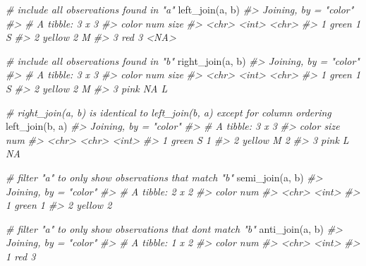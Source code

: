 \documentclass[
]{book}
\newenvironment{Shaded}{\begin{snugshade}}{\end{snugshade}}
\newcommand{\CommentTok}[1]{\textcolor[rgb]{0.56,0.35,0.01}{\textit{#1}}}
\newcommand{\FunctionTok}[1]{\textcolor[rgb]{0.00,0.00,0.00}{#1}}
\newcommand{\NormalTok}[1]{#1}
\begin{document}
\begin{Shaded}
\begin{Highlighting}[]
\CommentTok{\# include all observations found in "a"}
\FunctionTok{left\_join}\NormalTok{(a, b)}
\CommentTok{\#\textgreater{} Joining, by = "color"}
\CommentTok{\#\textgreater{} \# A tibble: 3 x 3}
\CommentTok{\#\textgreater{}   color    num size }
\CommentTok{\#\textgreater{}   \textless{}chr\textgreater{}  \textless{}int\textgreater{} \textless{}chr\textgreater{}}
\CommentTok{\#\textgreater{} 1 green      1 S    }
\CommentTok{\#\textgreater{} 2 yellow     2 M    }
\CommentTok{\#\textgreater{} 3 red        3 \textless{}NA\textgreater{}}

\CommentTok{\# include all observations found in "b"}
\FunctionTok{right\_join}\NormalTok{(a, b)}
\CommentTok{\#\textgreater{} Joining, by = "color"}
\CommentTok{\#\textgreater{} \# A tibble: 3 x 3}
\CommentTok{\#\textgreater{}   color    num size }
\CommentTok{\#\textgreater{}   \textless{}chr\textgreater{}  \textless{}int\textgreater{} \textless{}chr\textgreater{}}
\CommentTok{\#\textgreater{} 1 green      1 S    }
\CommentTok{\#\textgreater{} 2 yellow     2 M    }
\CommentTok{\#\textgreater{} 3 pink      NA L}

\CommentTok{\# right\_join(a, b) is identical to left\_join(b, a) except for column ordering}
\FunctionTok{left\_join}\NormalTok{(b, a)}
\CommentTok{\#\textgreater{} Joining, by = "color"}
\CommentTok{\#\textgreater{} \# A tibble: 3 x 3}
\CommentTok{\#\textgreater{}   color  size    num}
\CommentTok{\#\textgreater{}   \textless{}chr\textgreater{}  \textless{}chr\textgreater{} \textless{}int\textgreater{}}
\CommentTok{\#\textgreater{} 1 green  S         1}
\CommentTok{\#\textgreater{} 2 yellow M         2}
\CommentTok{\#\textgreater{} 3 pink   L        NA}

\CommentTok{\# filter "a" to only show observations that match "b"}
\FunctionTok{semi\_join}\NormalTok{(a, b)}
\CommentTok{\#\textgreater{} Joining, by = "color"}
\CommentTok{\#\textgreater{} \# A tibble: 2 x 2}
\CommentTok{\#\textgreater{}   color    num}
\CommentTok{\#\textgreater{}   \textless{}chr\textgreater{}  \textless{}int\textgreater{}}
\CommentTok{\#\textgreater{} 1 green      1}
\CommentTok{\#\textgreater{} 2 yellow     2}

\CommentTok{\# filter "a" to only show observations that don\textquotesingle{}t match "b"}
\FunctionTok{anti\_join}\NormalTok{(a, b)}
\CommentTok{\#\textgreater{} Joining, by = "color"}
\CommentTok{\#\textgreater{} \# A tibble: 1 x 2}
\CommentTok{\#\textgreater{}   color   num}
\CommentTok{\#\textgreater{}   \textless{}chr\textgreater{} \textless{}int\textgreater{}}
\CommentTok{\#\textgreater{} 1 red       3}
\end{Highlighting}
\end{Shaded}
\end{document}
